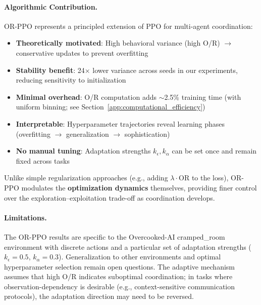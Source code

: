 \paragraph{Algorithmic Contribution.}

OR-PPO represents a principled extension of PPO for multi-agent coordination:
\begin{itemize}
    \item \textbf{Theoretically motivated}: High behavioral variance (high O/R) $\to$ conservative updates to prevent overfitting
    \item \textbf{Stability benefit}: 24$\times$ lower variance across seeds in our experiments, reducing sensitivity to initialization
    \item \textbf{Minimal overhead}: O/R computation adds $\sim$2.5\% training time (with uniform binning; see Section~\ref{app:computational_efficiency})
    \item \textbf{Interpretable}: Hyperparameter trajectories reveal learning phases (overfitting $\to$ generalization $\to$ sophistication)
    \item \textbf{No manual tuning}: Adaptation strengths $k_\epsilon, k_\alpha$ can be set once and remain fixed across tasks
\end{itemize}

Unlike simple regularization approaches (e.g., adding $\lambda \cdot \text{OR}$ to the loss), OR-PPO modulates the \textbf{optimization dynamics} themselves, providing finer control over the exploration--exploitation trade-off as coordination develops.


\paragraph{Limitations.}

The OR-PPO results are specific to the Overcooked-AI cramped\_room environment with discrete actions and a particular set of adaptation strengths ($k_\epsilon = 0.5$, $k_\alpha = 0.3$). Generalization to other environments and optimal hyperparameter selection remain open questions. The adaptive mechanism assumes that high O/R indicates suboptimal coordination; in tasks where observation-dependency is desirable (e.g., context-sensitive communication protocols), the adaptation direction may need to be reversed.

